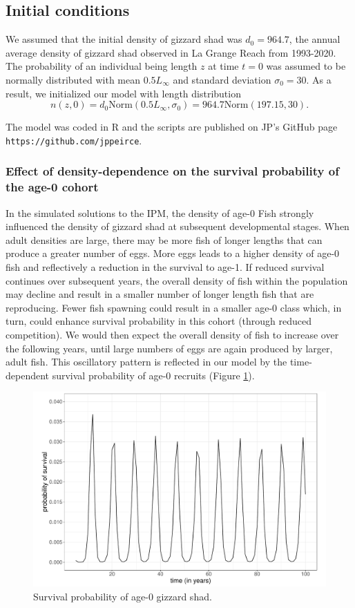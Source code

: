 \documentclass[preprint,review,12pt,authoryear]{elsarticle}
\begin{document}
\subsection{Initial conditions}  We assumed that the initial density of gizzard shad was $d_0 = 964.7$, the annual average density of gizzard shad observed in La Grange Reach from 1993-2020.  
The probability of an individual being length $z$ at time $t=0$  was assumed to be normally distributed with mean $0.5L_\infty$ and standard deviation $\sigma_0 = 30$.  
As a result, we initialized our model with length distribution
\begin{equation}\label{eq:n}
 n(z,0) = d_0 \mbox{Norm} (0.5 L_\infty, \sigma_0) = 964.7 \mbox{Norm} (197.15, 30). 
 \end{equation}

The model was coded in R \citep{R} and the scripts are published on JP's GitHub page \verb+https://github.com/jppeirce+.

\subsubsection{Effect of density-dependence on the survival probability of the age-0 cohort} \label{sec:survival}

In the simulated solutions to the IPM, the density of age-0 Fish strongly influenced the density of gizzard shad at subsequent developmental stages.
When adult densities are large, there may be more fish of longer lengths that can produce a greater number of eggs.  
More eggs leads to a higher density of age-0 fish and reflectively a reduction in the survival to age-1. 
If reduced survival continues over subsequent years, the overall density of fish within the population may decline and result in a smaller number of longer length fish that are reproducing.  
Fewer fish spawning could result in a smaller age-0 class which, in turn, could enhance survival probability in this cohort (through reduced competition). 
We would then expect the overall density of fish to increase over the following years, until large numbers of eggs are again produced by larger, adult fish.  
This oscillatory pattern is reflected in our model by the time-dependent survival probability of age-0 recruits (Figure \ref{fig:age0time}).

\begin{figure}
\centering
  \includegraphics[width=.4\textwidth]{figures/Figure2a.pdf}
   \caption{}
  \label{fig:age0time}
 
\caption{Survival probability of age-0 gizzard shad.}

\end{figure}    
\end{document}
